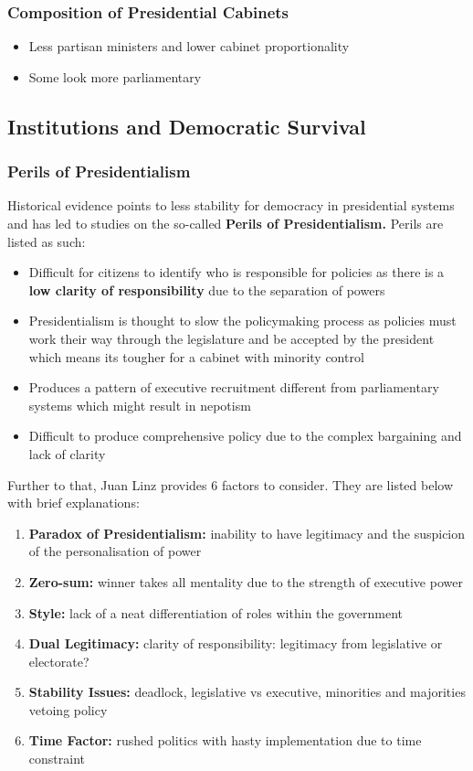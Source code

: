 \documentclass[12pt, letterpaper]{article}
\begin{document}
\subsubsection{Composition of Presidential Cabinets}
\begin{itemize}
	\item Less partisan ministers and lower cabinet proportionality
	\item Some look more parliamentary
\end{itemize}

\subsection{Institutions and Democratic Survival}
\subsubsection{Perils of Presidentialism}
Historical evidence points to less stability for democracy in presidential systems and has led to studies on the so-called \textbf{Perils of Presidentialism.} Perils are listed as such:
\begin{itemize}
	\item Difficult for citizens to identify who is responsible for policies as there is a \textbf{low clarity of responsibility} due to the separation of powers
	\item Presidentialism is thought to slow the policymaking process as policies must work their way through the legislature and be accepted by the president which means its tougher for a cabinet with minority control
	\item Produces a pattern of executive recruitment different from parliamentary systems which might result in nepotism
	\item Difficult to produce comprehensive policy due to the complex bargaining and lack of clarity
\end{itemize}
Further to that, Juan Linz provides 6 factors to consider. They are listed below with brief explanations:
\begin{enumerate}
	\item \textbf{Paradox of Presidentialism:} inability to have legitimacy and the suspicion of the personalisation of power
	\item \textbf{Zero-sum:} winner takes all mentality due to the strength of executive power
	\item \textbf{Style:} lack of a neat differentiation of roles within the government
	\item \textbf{Dual Legitimacy:} clarity of responsibility: legitimacy from legislative or electorate?
	\item \textbf{Stability Issues:} deadlock, legislative vs executive, minorities and majorities vetoing policy
	\item \textbf{Time Factor:} rushed politics with hasty implementation due to time constraint
\end{enumerate}
\end{document}
